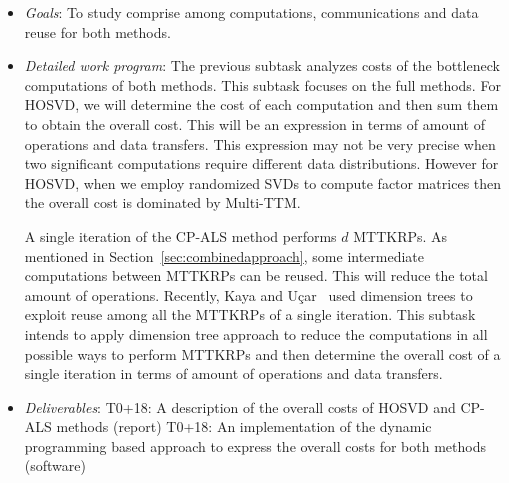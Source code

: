 \documentclass[a4paper,11pt]{article}
\newcommand{\goal}{{\color{orange2}  \emph{Goals}:} }
\newcommand{\dwp}{{\color{orange2}  \emph{Detailed work program}: }}
\newcommand{\deliverables}{{\color{orange2}  \emph{Deliverables}: }}
\begin{document}
	\begin{itemize}[leftmargin=-1pt]
		\item[] \goal To study comprise among computations, communications and data reuse for both methods. 
		\item[] \dwp The previous subtask analyzes costs of the bottleneck computations of both methods. This subtask focuses on the full methods. For HOSVD, we will determine the cost of each computation and then sum them to obtain the overall cost. This will be an expression in terms of amount of operations and data transfers. This expression may not be very precise when two significant computations require different data distributions. However for HOSVD, when we employ randomized SVDs to compute factor matrices then the overall cost is dominated by Multi-TTM.
		
		A single iteration of the CP-ALS method performs $d$ MTTKRPs. As mentioned in Section~\ref{sec:combinedapproach}, some intermediate computations between MTTKRPs can be reused. This will reduce the total amount of operations. Recently, Kaya and Uçar~\cite{KU-SISC-2018} used dimension trees to exploit reuse among all the MTTKRPs of a single iteration. This subtask intends to apply dimension tree approach to reduce the computations in all possible ways to perform MTTKRPs and then determine the overall cost of a single iteration in terms of amount of operations and data transfers.
		\item[] \deliverables T0+18: A description of the overall costs of HOSVD and CP-ALS methods (report)\newline
		T0+18: An implementation of the dynamic programming based approach to express the overall costs for both methods (software)
	\end{itemize}
	
\end{document}
